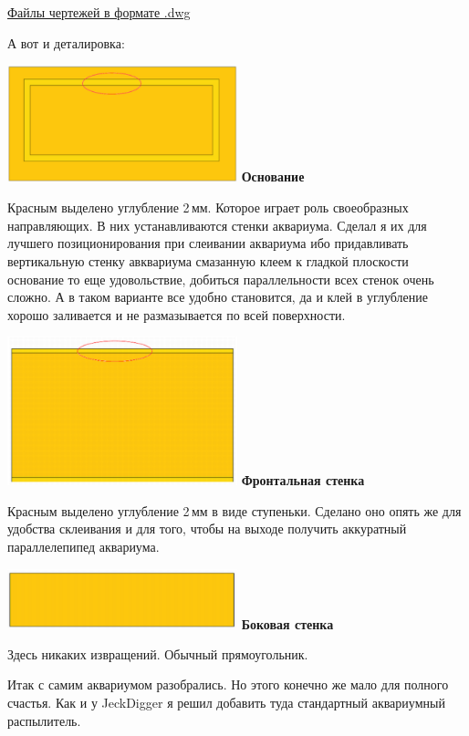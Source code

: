 {\href{}{Файлы чертежей в формате .dwg}

А вот и деталировка:

\noindent\includegraphics[width=0.5\textwidth]{00/fig/smit/ee000018.png}
\textbf{Основание}

Красным выделено углубление 2\,мм. Которое играет роль своеобразных
направляющих. В них устанавливаются стенки аквариума. Сделал я их для лучшего
позиционирования при слеивании аквариума ибо придавливать вертикальную стенку
авквариума смазанную клеем к гладкой плоскости основание то еще удовольствие,
добиться параллельности всех стенок очень сложно. А в таком варианте все удобно
становится, да и клей в углубление хорошо заливается и не размазывается по всей
поверхности.

\noindent\includegraphics[width=0.5\textwidth]{00/fig/smit/ee000019.png}
\textbf{Фронтальная стенка}

Красным выделено углубление 2\,мм в виде ступеньки. Сделано оно опять же для
удобства склеивания и для того, чтобы на выходе получить аккуратный
параллелепипед аквариума. \smiley

\noindent\includegraphics[width=0.5\textwidth]{00/fig/smit/ee000020.png}
\textbf{Боковая стенка}

Здесь никаких извращений. Обычный прямоугольник. \smiley
\bigskip

Итак с самим аквариумом разобрались. Но этого конечно же мало для полного
счастья. Как и у JeckDigger я решил добавить туда стандартный аквариумный
распылитель.

}
